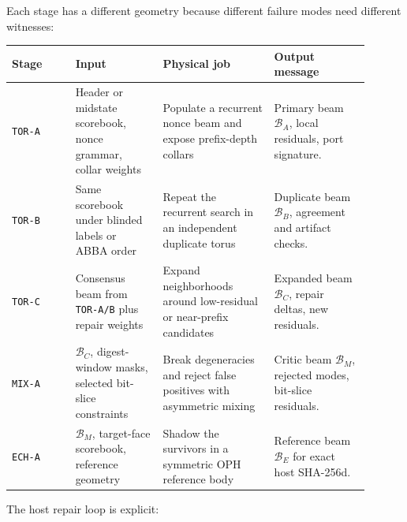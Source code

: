 \documentclass[11pt]{article}
\theoremstyle{definition}
\theoremstyle{remark}
\begin{document}
Each stage has a different geometry because different failure modes need
different witnesses:

\begin{center}
\begin{minipage}{\linewidth}
\centering
\small
\setlength{\tabcolsep}{3pt}
\begin{tabular}{L{0.16\linewidth}L{0.22\linewidth}L{0.28\linewidth}L{0.24\linewidth}}
\toprule
Stage & Input & Physical job & Output message\\
\midrule
\texttt{TOR-A} &
Header or midstate scorebook, nonce grammar, collar weights &
Populate a recurrent nonce beam and expose prefix-depth collars &
Primary beam \(\mathcal B_A\), local residuals, port signature.\\
\texttt{TOR-B} &
Same scorebook under blinded labels or ABBA order &
Repeat the recurrent search in an independent duplicate torus &
Duplicate beam \(\mathcal B_B\), agreement and artifact checks.\\
\texttt{TOR-C} &
Consensus beam from \texttt{TOR-A/B} plus repair weights &
Expand neighborhoods around low-residual or near-prefix candidates &
Expanded beam \(\mathcal B_C\), repair deltas, new residuals.\\
\texttt{MIX-A} &
\(\mathcal B_C\), digest-window masks, selected bit-slice constraints &
Break degeneracies and reject false positives with asymmetric mixing &
Critic beam \(\mathcal B_M\), rejected modes, bit-slice residuals.\\
\texttt{ECH-A} &
\(\mathcal B_M\), target-face scorebook, reference geometry &
Shadow the survivors in a symmetric OPH reference body &
Reference beam \(\mathcal B_E\) for exact host SHA-256d.\\
\bottomrule
\end{tabular}
\label{tab:omega-i1-executable-route}
\end{minipage}
\end{center}

The host repair loop is explicit:
\end{document}
